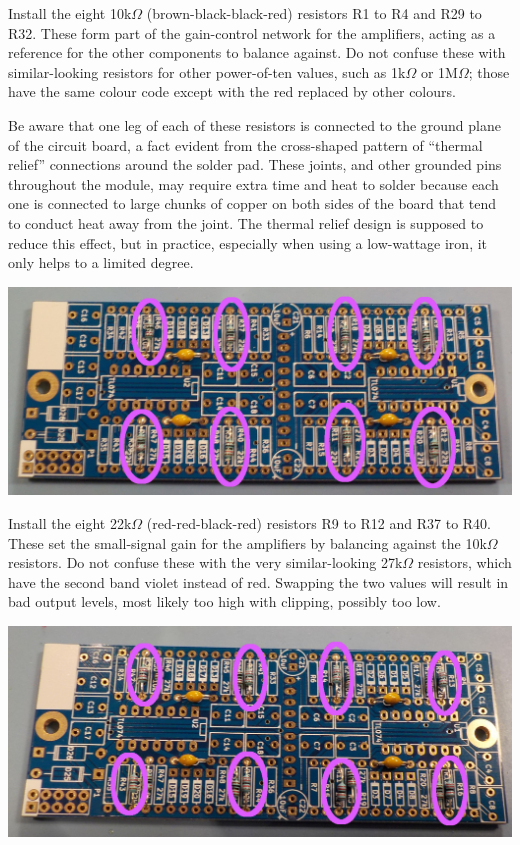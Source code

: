 Install the eight 10k$\Omega$ (brown-black-black-red) resistors R1 to R4 and
R29 to R32.  These form part of the gain-control network for the amplifiers,
acting as a reference for the other components to balance against.  Do
not confuse these with similar-looking resistors for other power-of-ten
values, such as 1k$\Omega$ or 1M$\Omega$; those have the same colour code
except with the red replaced by other colours.

Be aware that one leg of each of these resistors is connected to the ground
plane of the circuit board, a fact evident from the cross-shaped pattern of
``thermal relief'' connections around the solder pad.  These joints, and
other grounded pins throughout the module, may require extra time and heat
to solder because each one is connected to large chunks of copper on both
sides of the board that tend to conduct heat away from the joint.  The
thermal relief design is supposed to reduce this effect, but in practice,
especially when using a low-wattage iron, it only helps to a limited degree.

\noindent\includegraphics[width=\linewidth]{res-10k.jpg}

Install the eight 22k$\Omega$ (red-red-black-red) resistors R9 to R12 and
R37 to R40.  These set the small-signal gain for the amplifiers by balancing
against the 10k$\Omega$ resistors.  Do not confuse these with the very
similar-looking 27k$\Omega$ resistors, which have the second band violet
instead of red.  Swapping the two values will result in bad output levels,
most likely too high with clipping, possibly too low.

\noindent\includegraphics[width=\linewidth]{res-22k.jpg}

